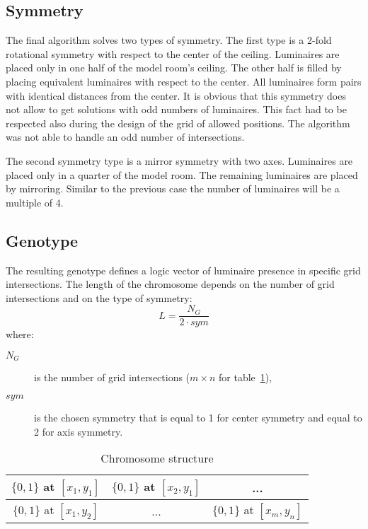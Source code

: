 \subsection{Symmetry}
The final algorithm solves two types of symmetry. The first type is a 2-fold rotational symmetry with respect to the center of the ceiling. Luminaires are placed only in one half of the model room's ceiling. The other half is filled by placing equivalent luminaires with respect to the center. All luminaires form pairs with identical distances from the center. It is obvious that this symmetry does not allow to get solutions with odd numbers of luminaires. This fact had to be respected also during the design of the grid of allowed positions. The algorithm was not able to handle an odd number of intersections.

The second symmetry type is a mirror symmetry with two axes. Luminaires are placed only in a quarter of the model room. The remaining luminaires are placed by mirroring. Similar to the previous case the number of luminaires will be a multiple of 4.

\subsection{Genotype}
The resulting genotype defines a logic vector of luminaire presence in specific grid intersections. The length of the chromosome depends on the number of grid intersections and on the type of symmetry:
\begin{equation}
\label{eq:chromLength}
L = \frac{N_G}{2\cdot sym}
\end{equation}
where:
\begin{description}
	\item[$N_G$] is the number of grid intersections ($m\times n$ for table~\ref{tab:strucgenotype}),
	\item[$sym$] is the chosen symmetry that is equal to 1 for center symmetry and equal to 2 for axis symmetry.
\end{description}

\begin{table}[htb]
	\renewcommand{\arraystretch}{1.3}
	\caption{Chromosome structure}
 	\label{tab:strucgenotype}
	\centering
  \begin{tabular}{| c | c | c |}
    \hline
    $\lbrace0,1\rbrace$ at $[x_1,y_1]$ & $\lbrace0,1\rbrace$ at $[x_2,y_1]$ & ... \\
    \hline
    $\lbrace0,1\rbrace$ at $[x_1,y_2]$ & ... & $\lbrace0,1\rbrace$ at $[x_m,y_n]$ \\
    \hline
  \end{tabular}
\end{table}

